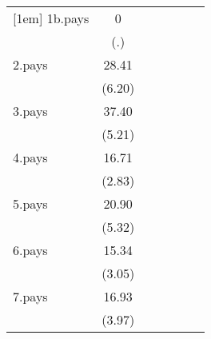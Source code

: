 {\begin{tabular}{l*{6}{c}}
[1em]
1b.pays             &           0         &                     &                     &                     &                     &                     \\
                    &         (.)         &                     &                     &                     &                     &                     \\
[1em]
2.pays              &       28.41\sym{***}&                     &                     &                     &                     &                     \\
                    &      (6.20)         &                     &                     &                     &                     &                     \\
[1em]
3.pays              &       37.40\sym{***}&                     &                     &                     &                     &                     \\
                    &      (5.21)         &                     &                     &                     &                     &                     \\
[1em]
4.pays              &       16.71\sym{**} &                     &                     &                     &                     &                     \\
                    &      (2.83)         &                     &                     &                     &                     &                     \\
[1em]
5.pays              &       20.90\sym{***}&                     &                     &                     &                     &                     \\
                    &      (5.32)         &                     &                     &                     &                     &                     \\
[1em]
6.pays              &       15.34\sym{**} &                     &                     &                     &                     &                     \\
                    &      (3.05)         &                     &                     &                     &                     &                     \\
[1em]
7.pays              &       16.93\sym{***}&                     &                     &                     &                     &                     \\
                    &      (3.97)         &                     &                     &                     &                     &                     \\

\end{tabular}}
